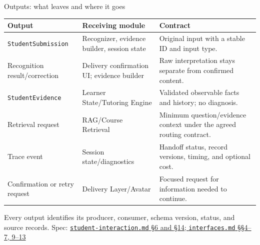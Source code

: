 \documentclass[aspectratio=169,10pt]{beamer}
\newcommand{\specnote}[2]{%
  \vfill\hfill{\tiny\color{Muted}Spec: \href{run:../../specs/#1}{\texttt{#1} #2}}}
\begin{document}
\begin{frame}{Outputs: what leaves and where it goes}
\footnotesize
\begin{tabularx}{\textwidth}{@{}P{.25\textwidth}P{.29\textwidth}Y@{}}
\toprule
\textbf{Output} & \textbf{Receiving module} & \textbf{Contract} \\
\midrule
\texttt{StudentSubmission} & Recognizer, evidence builder, session state & Original input with a stable ID and input type. \\
\addlinespace
Recognition result/correction & Delivery confirmation UI; evidence builder & Raw interpretation stays separate from confirmed content. \\
\addlinespace
\texttt{StudentEvidence} & Learner State/Tutoring Engine & Validated observable facts and history; no diagnosis. \\
\addlinespace
Retrieval request & RAG/Course Retrieval & Minimum question/evidence context under the agreed routing contract. \\
\addlinespace
Trace event & Session state/diagnostics & Handoff status, record versions, timing, and optional cost. \\
\addlinespace
Confirmation or retry request & Delivery Layer/Avatar & Focused request for information needed to continue. \\
\bottomrule
\end{tabularx}
\vspace{.4em}
\centering
Every output identifies its producer, consumer, schema version, status, and source records.
\specnote{student-interaction.md}{\S6 and \S14; \texttt{interfaces.md} \S\S4--7, 9--13}
\end{frame}
\end{document}
